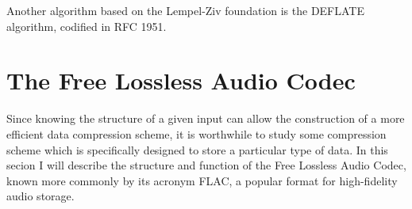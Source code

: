\documentclass[12pt]{article}
\begin{document}
Another algorithm based on the Lempel-Ziv foundation is the DEFLATE
algorithm, codified in RFC 1951. \cite{RFC1951}

\section{The Free Lossless Audio Codec}

Since knowing the structure of a given input can allow the
construction of a more efficient data compression scheme, it is
worthwhile to study some compression scheme which is specifically
designed to store a particular type of data. In this secion I will
describe the structure and function of the Free Lossless Audio Codec,
known more commonly by its acronym FLAC, a popular format for
high-fidelity audio storage.



\end{document}
